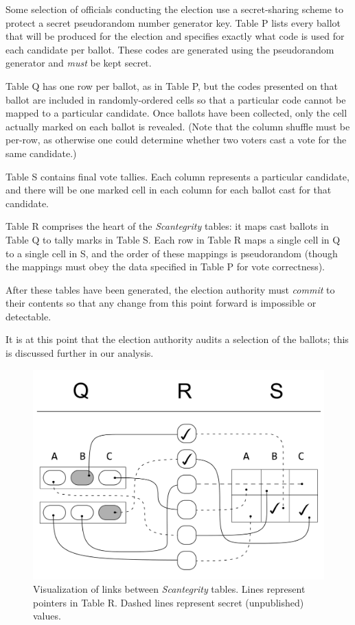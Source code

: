 \documentclass[10pt,twocolumn]{article}
\newcommand{\term}[1]{\textit{#1}}
\begin{document}
Some selection of officials conducting the election use a secret-sharing scheme to protect a
secret pseudorandom number generator key. Table P lists every ballot that will be produced for the
election and specifies exactly what code is used for each candidate per ballot. These codes are
generated using the pseudorandom generator and \emph{must} be kept secret.

Table Q has one row per ballot, as in Table P, but the codes presented on that ballot are included
in randomly-ordered cells so that a particular code cannot be mapped to a particular candidate.
Once ballots have been collected, only the cell actually marked on each ballot is revealed. (Note
that the column shuffle must be per-row, as otherwise one could determine whether two voters
cast a vote for the same candidate.)

Table S contains final vote tallies. Each column represents a particular candidate, and there will
be one marked cell in each column for each ballot cast for that candidate.

Table R comprises the heart of the \term{Scantegrity} tables: it maps cast ballots in Table Q to tally marks
in Table S. Each row in Table R maps a single cell in Q to a single cell in S, and the order of
these mappings is pseudorandom (though the mappings must obey the data specified in Table P for vote
correctness).

After these tables have been generated, the election authority must \term{commit} to their contents
so that any change from this point forward is impossible or detectable.

It is at this point that the election authority audits a selection of the ballots; this is discussed
further in our analysis.

\begin{figure}
	\center
	\includegraphics[width=\columnwidth]{images/include/scantegrity.pdf}
	\caption{
		Visualization of links between \term{Scantegrity} tables.
		Lines represent pointers in Table R.
		Dashed lines represent secret (unpublished) values.
	}
	\label{fig:scantegrity}
\end{figure}
\end{document}
